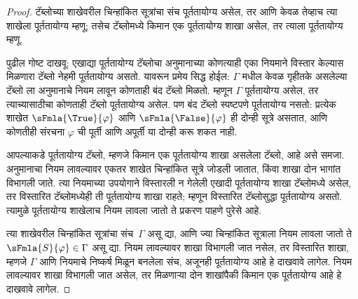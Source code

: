 \begin{proof}
टॅब्लोच्या शाखेवरील चिन्हांकित सूत्रांचा संच पूर्ततायोग्य असेल, तर
आणि केवळ तेव्हाच त्या शाखेला पूर्ततायोग्य म्हणू; तसेच टॅब्लोमध्ये
किमान एक पूर्ततायोग्य शाखा असेल, तर त्याला पूर्ततायोग्य म्हणू.

पुढील गोष्ट दाखवू: एखाद्या पूर्ततायोग्य टॅब्लोचा अनुमानाच्या कोणत्याही
एका नियमाने विस्तार केल्यास मिळणारा टॅब्लो नेहमी पूर्ततायोग्य असतो.
यावरून प्रमेय सिद्ध होईल: $\Gamma$ मधील केवळ गृहीतके असलेल्या टॅब्लो ला
अनुमानाचे नियम लावून कोणताही बंद टॅब्लो मिळतो. म्हणून $\Gamma$
पूर्ततायोग्य असेल, तर त्याच्यासाठीचा कोणताही टॅब्लो पूर्ततायोग्य असेल.
पण बंद टॅब्लो स्पष्टपणे पूर्ततायोग्य नसतो: प्रत्येक शाखेत
$\sFmla{\True}{\varphi}$ आणि $\sFmla{\False}{\varphi}$ ही दोन्ही सूत्रे असतात, आणि
कोणतीही संरचना $\varphi$ ची पूर्ती आणि अपूर्ती या दोन्ही करू शकत नाही.

आपल्याकडे पूर्ततायोग्य टॅब्लो, म्हणजे किमान एक पूर्ततायोग्य शाखा असलेला
टॅब्लो, आहे असे समजा. अनुमानाचा नियम लावल्यावर एकतर शाखेत
चिन्हांकित सूत्रे जोडली जातात, किंवा शाखा दोन भागांत विभागली जाते. त्या
नियमाच्या उपयोगाने विस्तारली न गेलेली एखादी पूर्ततायोग्य शाखा टॅब्लोमध्ये
असेल, तर विस्तारित टॅब्लोमध्येही ती पूर्ततायोग्य शाखा राहते; म्हणून
विस्तारित टॅब्लोसुद्धा पूर्ततायोग्य असतो. त्यामुळे पूर्ततायोग्य शाखेलाच नियम
लावला जातो ते प्रकरण पाहणे पुरेसे आहे.

त्या शाखेवरील चिन्हांकित सूत्रांचा संच~$\Gamma$ असू द्या, आणि ज्या
चिन्हांकित सूत्राला नियम लावला जातो ते $\sFmla{S}{\varphi} \in \Gamma$ असू
द्या. नियम लावल्यावर शाखा विभागली जात नसेल, तर विस्तारित शाखा, म्हणजे
$\Gamma$ आणि नियमाचे निष्कर्ष मिळून बनलेला संच, अजूनही पूर्ततायोग्य आहे हे
दाखवावे लागेल. नियम लावल्यावर शाखा विभागली जात असेल, तर मिळणाऱ्या दोन
शाखांपैकी किमान एक पूर्ततायोग्य आहे हे दाखवावे लागेल.


\end{proof}
